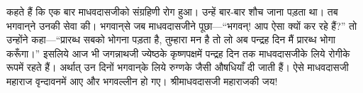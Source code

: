 \begin{sloppypar}\justifying{}
कहते हैं कि एक बार माधवदासजीको संग्रहिणी रोग हुआ। उन्हें बार-बार शौच जाना पड़ता था। तब भगवान्‌ने उनकी सेवा की। भगवान्‌से जब माधवदासजीने पूछा—“भगवन्! आप ऐसा क्यों कर रहे हैं?” तो उन्होंने कहा—“प्रारब्ध सबको भोगना पड़ता है, तुम्हारा मन है तो लो अब पन्द्रह दिन मैं प्रारब्ध भोगा करूँगा।” इसलिये आज भी जगन्नाथजी ज्येष्ठके कृष्णपक्षमें पन्द्रह दिन तक माधवदासजीके लिये रोगीके रूपमें रहते हैं। अर्थात् उन दिनों भगवान्‌के लिये रुग्णके जैसी औषधियाँ दी जाती हैं। ऐसे माधवदासजी महाराज वृन्दावनमें आए और भगवल्लीन हो गए। श्रीमाधवदासजी महाराजकी जय!
\end{sloppypar}


